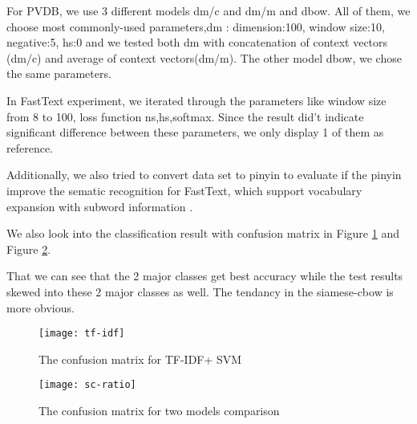 For PVDB, we use 3 different models dm/c and dm/m and dbow. All of them, we choose most commonly-used parameters,dm : dimension:100, window size:10, negative:5, hs:0 and we tested both dm with concatenation of context vectors (dm/c) and average of context vectors(dm/m). 
The other model dbow, we chose the same parameters.

In FastText experiment, we iterated through the parameters like window size from 8 to 100, 
loss function ns,hs,softmax.  Since the result did't indicate significant difference between these parameters, 
we only display 1 of them as reference.

Additionally, we also tried to convert data set to pinyin to evaluate 
if the pinyin improve the sematic recognition for FastText, 
which support vocabulary expansion with subword information \cite{bojanowski2016enriching}. 

We also look into the classification result with confusion matrix in Figure \ref{confusion1} and Figure \ref{confusion2}.

That we can see that the 2 major classes get best accuracy while the test results skewed into these 2 major classes as well.  
The tendancy in the siamese-cbow is more obvious. 

\begin{figure}[h]
    \centering
	\texttt{[image: tf-idf]}
    \caption{The confusion matrix for TF-IDF+ SVM}
    \label{confusion1}
\end{figure}

\begin{figure}[h]
    \centering
	\texttt{[image: sc-ratio]}
    \caption{The confusion matrix for two models comparison}
    \label{confusion2}
\end{figure}